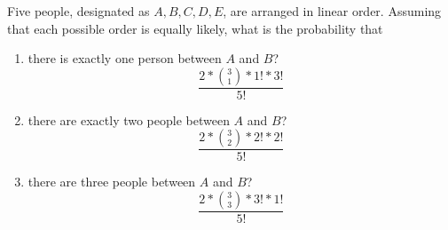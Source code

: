 \item Five people, designated as $A, B, C, D, E$, are arranged in linear order. Assuming that each possible order is equally likely, what is the probability that
\begin{enumerate}
    \item there is exactly one person between $A$ and $B$?
    \[ \frac{2 * \binom{3}{1} * 1! * 3!}{5!} \]
    \item there are exactly two people between $A$ and $B$?
    \[ \frac{2 * \binom{3}{2} * 2! * 2!}{5!} \]
    \item there are three people between $A$ and $B$?
    \[ \frac{2 * \binom{3}{3} * 3! * 1!}{5!} \]
\end{enumerate}